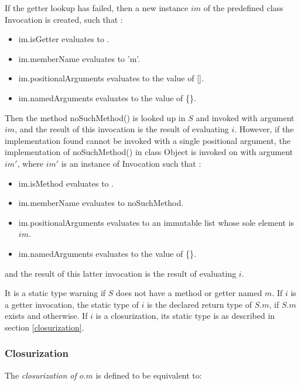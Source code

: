 \documentclass{article}
\newcommand{\code}[1]{{\sf #1}}
\begin{document}
\LMHash{}
If the getter lookup has failed, then a new instance $im$  of the predefined class  \code{Invocation}  is created, such that :
\begin{itemize}
\item  \code{im.isGetter} evaluates to \code{\TRUE{}}.
\item  \code{im.memberName} evaluates to \code{'m'}.
\item \code{im.positionalArguments} evaluates to the value of \code{\CONST{} []}.
\item \code{im.namedArguments} evaluates to the value of \code{\CONST{} \{\}}.
\end{itemize}
Then the method \code{noSuchMethod()} is looked up in $S$ and invoked  with argument $im$, and the result of this invocation is the result of evaluating $i$. However, if the implementation found cannot be invoked with a single positional argument, the implementation  of \code{noSuchMethod()} in class \code{Object} is invoked on \THIS{} with argument $im'$, where $im'$ is an instance of \code{Invocation} such that :
\begin{itemize}
\item  \code{im.isMethod} evaluates to \code{\TRUE{}}.
\item  \code{im.memberName} evaluates to \code{noSuchMethod}.
\item \code{im.positionalArguments} evaluates to an immutable list whose sole element is  $im$.
\item \code{im.namedArguments} evaluates to the value of \code{\CONST{} \{\}}.
\end{itemize}

and the result of this latter invocation is the result of evaluating $i$.

\LMHash{}
It is a static type warning if $S$ does not have a method or getter named $m$.  If $i$ is a getter invocation, the static type of $i$ is the declared return type of $S.m$, if $S.m$ exists and  \DYNAMIC{} otherwise. If $i$ is a closurization, its static type is as described in section \ref{closurization}.


\subsubsection{Closurization}

\LMHash{}
The {\em closurization of $o.m$} is defined to be equivalent to:
\end{document}
